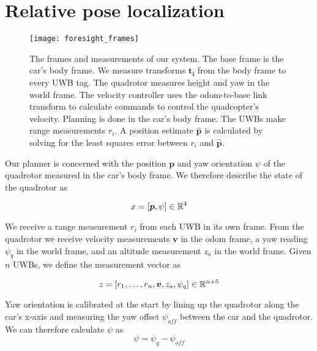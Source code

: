 
\section{Relative pose localization}

\begin{figure}
  \centering
    \texttt{[image: foresight\_frames]}
  \caption{The frames and measurements of our system. The base frame
   is the car's body frame. We measure transforms $\bm{t_{i}}$ from the body
   frame to every UWB tag. The quadrotor measures height and yaw in the world
   frame. The velocity controller uses the odom-to-base\textunderscore 
   link transform to calculate commands to control the quadcopter's velocity.
   Planning is done in the car's body frame.
   The UWBs make range measurements $r_{i}$. A position estimate $\bm{\hat{p}}$
   is calculated by solving for the least squares error between $r_{i}$ and $\bm{\hat{p}}$.}
  \label{fig:frames}
\end{figure}

Our planner is concerned with the position $\bm{p}$ and yaw orientation $\psi$
of the quadrotor measured in the car's body frame. We therefore describe the state of the quadrotor as

$$
    x = [\bm{p}, \psi] \in \mathbb{R}^4
$$

We receive a range measurement $r_i$ from each UWB in its own frame. 
From the quadrotor we receive velocity measurements $\bm{v}$ in the odom frame,
a yaw reading $\psi_q$ in the world frame, and an altitude measurement $z_a$ in 
the world frame. Given $n$ UWBs, we define the measurement vector as

$$
   z = [r_1, \dots, r_n, \bm{v}, z_a, \psi_q] \in \mathbb{R}^{n+5}
$$



Yaw orientation is calibrated at the start by lining up the quadrotor along the car's x-axis
and measuring the yaw offset $\psi_{off}$ between the car and the quadrotor.
We can therefore calculate $\psi$ as
$$
   \psi = \psi_q - \psi_{off}
$$

